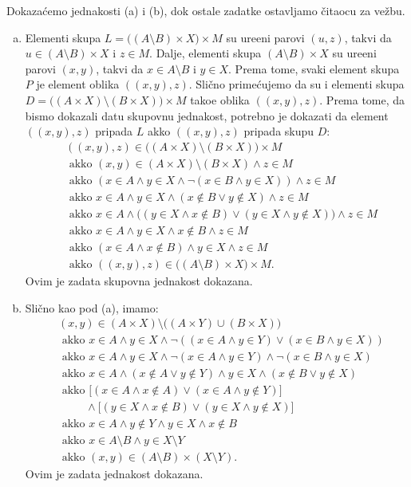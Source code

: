 { Dokaza\' cemo jednakosti (a) i (b), dok ostale zadatke ostavljamo \v citaocu za ve\v zbu.
\begin{enumerate}[(a)]
\item Elementi skupa $L=\big((A\setminus B)\times X\big)\times M$ su ure\dj eni parovi $(u,z)$, takvi da $u\in (A\setminus B)\times X$ i $z\in M$. Dalje, elementi skupa $(A\setminus B)\times X$ su ure\dj eni parovi $(x,y)$, takvi da $x\in A\setminus B$ i $y\in X$. Prema tome, svaki element skupa $P$ je element oblika $((x,y),z)$. Sli\v cno prime\' cujemo da su i elementi skupa $D=\big((A\times X)\setminus(B\times X)\big)\times M$ tako\dj e oblika $((x,y),z)$.
Prema tome, da bismo dokazali datu skupovnu jednakost, potrebno je dokazati da element $((x,y),z)$ pripada $L$ akko $((x,y),z)$ pripada skupu $D$:
\begin{align*}
&((x,y),z)\in \big((A\times X)\setminus(B\times X)\big)\times M\\
&\text{ akko } (x,y)\in (A\times X)\setminus(B\times X)\wedge z\in M \\
&\text{ akko }(x\in A\wedge y\in X\wedge\neg(x\in B\wedge y\in X))\wedge z\in M\\
&\text{ akko }x\in A\wedge y\in X\wedge(x\not\in B\vee y\not\in X)\wedge z\in M\\
&\text{ akko }x\in A\wedge \big((y\in X\wedge x\not\in B)\vee(y\in X\wedge y\not\in X)\big)\wedge z\in M\\
&\text{ akko }x\in A\wedge y\in X\wedge x\not\in B\wedge z\in M\\
&\text{ akko }(x\in A\wedge x\not\in B)\wedge y\in X\wedge z\in M\\
&\text{ akko }((x,y),z)\in \big((A\setminus B)\times X\big)\times M.
\end{align*}
Ovim je zadata skupovna jednakost dokazana.
\item Sli\v cno kao pod (a), imamo:
\begin{align*}
&(x,y)\in (A\times X)\setminus\big((A\times Y)\cup(B\times X)\big)\\
&\text{ akko }x\in A\wedge y\in X\wedge\neg ((x\in A\wedge y\in Y)\vee (x\in B\wedge y\in X))\\
&\text{ akko }x\in A\wedge y\in X\wedge \neg (x\in A\wedge y\in Y)\wedge \neg(x\in B\wedge y\in X)\\
&\text{ akko }x\in A\wedge (x\not\in A\vee y\not\in Y)\wedge y\in X\wedge (x\not\in B\vee y\not\in X)\\
&\text{ akko }\big[(x\in A\wedge x\not\in A)\vee (x\in A\wedge y\not\in Y)\big]\\
&\ \ \ \ \ \ \ \ \ \ \ \wedge \big[ (y\in X\wedge x\not\in B)\vee(y\in X\wedge y\not\in X)  \big]\\
&\text{ akko }x\in A\wedge y\not\in Y\wedge y\in X\wedge x\not\in B\\
&\text{ akko }x\in A\setminus B\wedge y\in X\setminus Y\\
&\text{ akko }(x,y)\in (A\setminus B)\times(X\setminus Y).
\end{align*}
Ovim je zadata jednakost dokazana.
\end{enumerate}

}
